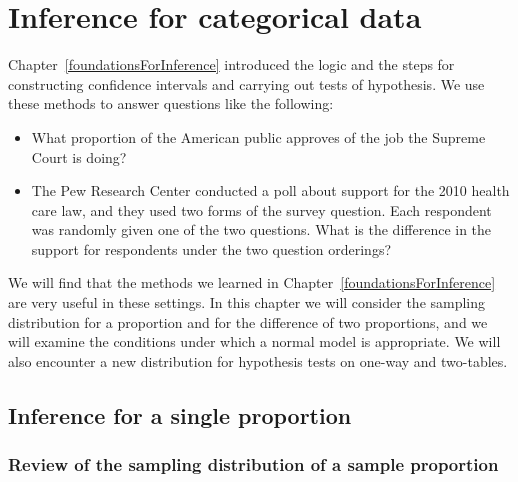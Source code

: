 \chapter{Inference for categorical data}
\label{inferenceForCategoricalData}

Chapter~\ref{foundationsForInference} introduced the logic and the steps for constructing confidence intervals and carrying out tests of hypothesis.  We use these methods to answer questions like the following:
\begin{itemize}
\setlength{\itemsep}{0mm}
\item What proportion of the American public approves of the job the Supreme Court is doing?
\item The Pew Research Center conducted a poll about support for the 2010 health care law, and they used two forms of the survey question. Each respondent was randomly given one of the two questions. What is the difference in the support for respondents under the two question orderings?
\end{itemize}
We will find that the methods we learned in Chapter~\ref{foundationsForInference} are very useful in these settings. In this chapter we will consider the sampling distribution for a proportion and for the difference of two proportions, and we will examine the conditions under which a normal model is appropriate. We will also encounter a new distribution for hypothesis tests on one-way and two-tables.



\section{Inference for a single proportion}
\label{singleProportion}

\subsection{Review of the sampling distribution of a sample proportion}



